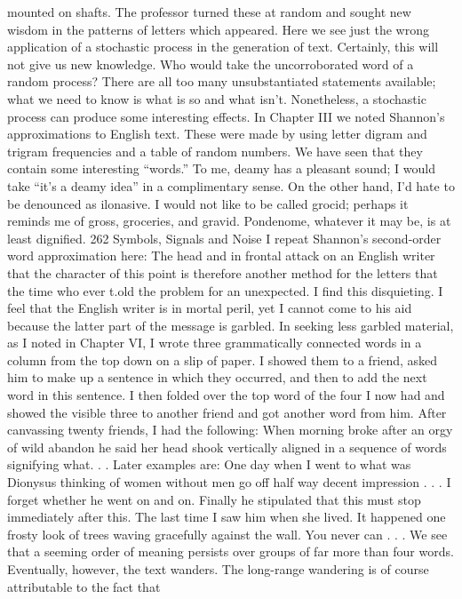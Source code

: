 {{{{{{{{{{{{mounted on shafts. The professor turned these at random and
sought new wisdom in the patterns of letters which appeared.
Here we see just the wrong application of a stochastic process
in the generation of text. Certainly, this will not give us new
knowledge. Who would take the uncorroborated word of a random
process? There are all too many unsubstantiated statements available;
what we need to know is what is so and what isn’t.
Nonetheless, a stochastic process can produce some interesting
effects. In Chapter III we noted Shannon’s approximations to
English text. These were made by using letter digram and trigram
frequencies and a table of random numbers. We have seen that they
contain some interesting “words.”
To me, deamy has a pleasant sound; I would take “it’s a deamy
idea” in a complimentary sense. On the other hand, I’d hate to be
denounced as ilonasive. I would not like to be called grocid; perhaps
it reminds me of gross, groceries, and gravid. Pondenome,
whatever it may be, is at least dignified.
262 Symbols, Signals and Noise
I repeat Shannon’s second-order word approximation here:
The head and in frontal attack on an English writer that the character
of this point is therefore another method for the letters that the time who
ever t.old the problem for an unexpected.
I find this disquieting. I feel that the English writer is in mortal
peril, yet I cannot come to his aid because the latter part of the
message is garbled.
In seeking less garbled material, as I noted in Chapter VI, I wrote
three grammatically connected words in a column from the top
down on a slip of paper. I showed them to a friend, asked him to
make up a sentence in which they occurred, and then to add the
next word in this sentence. I then folded over the top word of the
four I now had and showed the visible three to another friend and
got another word from him. After canvassing twenty friends, I had
the following:
When morning broke after an orgy of wild abandon he said her head
shook vertically aligned in a sequence of words signifying what. . .
Later examples are:
One day when I went to what was Dionysus thinking of women without
men go off half way decent impression . . .
I forget whether he went on and on. Finally he stipulated that this must
stop immediately after this. The last time I saw him when she lived.
It happened one frosty look of trees waving gracefully against the wall.
You never can . . .
We see that a seeming order of meaning persists over groups of
far more than four words. Eventually, however, the text wanders.
The long-range wandering is of course attributable to the fact that
}}}}}}}}}}}}
